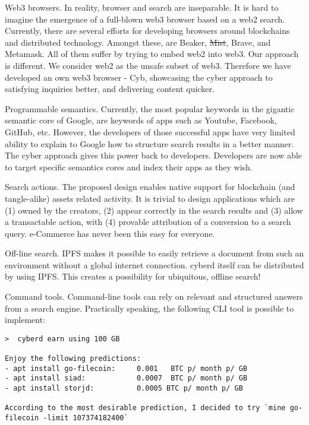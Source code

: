 \documentclass[8pt,oneside]{amsart}
\newcommand{\code}[1]{{\PlayBold #1}}
\begin{document}
\begin{Abstract}
\code{Web3 browsers}. In reality, browser and search are inseparable. It is hard to imagine the emergence of a full-blown web3 browser based on a web2 search. Currently, there are several efforts for developing browsers around blockchains and distributed technology. Amongst these, are Beaker, \sout{Mist}, Brave, and Metamask. All of them suffer by trying to embed web2 into web3. Our approach is different. We consider web2 as the unsafe subset of web3. Therefore we have developed an own web3 browser - Cyb, showcasing the cyber approach to satisfying inquiries better, and delivering content quicker.

\code{Programmable semantics}. Currently, the most popular keywords in the gigantic semantic core of Google, are keywords of apps such as Youtube, Facebook, GitHub, etc. However, the developers of those successful apps have very limited ability to explain to Google how to structure search results in a better manner. The cyber approach gives this power back to developers. Developers are now able to target specific semantics cores and index their apps as they wish.

\code{Search actions}. The proposed design enables native support for blockchain (and tangle-alike) assets related activity. It is trivial to design applications which are (1) owned by the creators, (2) appear correctly in the search results and (3) allow a transactable action, with (4) provable attribution of a conversion to a search query. e-Commerce has never been this easy for everyone.

\code{Off-line search}. IPFS makes it possible to easily retrieve a document from such an environment without a global internet connection. cyberd itself can be distributed by using IPFS. This creates a possibility for ubiquitous, offline search!

\code{Command tools}. Command-line tools can rely on relevant and structured answers from a search engine. Practically speaking, the following CLI tool is possible to implement:

\begin{lstlisting}
>  cyberd earn using 100 GB

Enjoy the following predictions:
- apt install go-filecoin:     0.001   BTC p/ month p/ GB
- apt install siad:            0.0007  BTC p/ month p/ GB
- apt install storjd:          0.0005 BTC p/ month p/ GB

According to the most desirable prediction, I decided to try `mine go-filecoin -limit 107374182400`


\end{lstlisting}
\end{Abstract}
\end{document}
